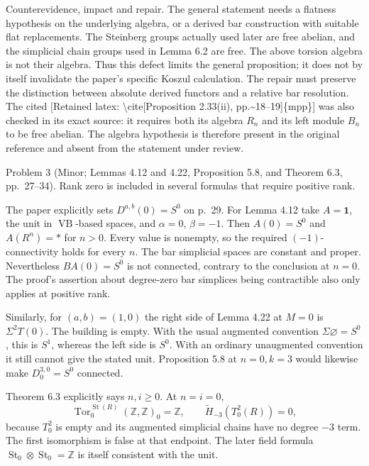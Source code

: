 \documentclass[10pt]{article}
\begin{document}
Counterevidence, impact and repair. The general statement needs a flatness hypothesis on the underlying algebra, or a derived bar construction with suitable flat replacements. The Steinberg groups actually used later are free abelian, and the simplicial chain groups used in Lemma 6.2 are free. The above torsion algebra is not their algebra. Thus this defect limits the general proposition; it does not by itself invalidate the paper’s specific Koszul calculation. The repair must preserve the distinction between absolute derived functors and a relative bar resolution. The cited [Retained latex: \textbackslash{}cite[Proposition 2.33(ii), pp.\textasciitilde{}18--19]\{mpp\}] was also checked in its exact source: it requires both its algebra \(R_n\) and its left module \(B_n\) to be free abelian. The algebra hypothesis is therefore present in the original reference and absent from the statement under review.\par
Problem 3 (Minor; Lemmas 4.12 and 4.22, Proposition 5.8, and Theorem 6.3, pp. 27–34).  Rank zero is included in several formulas that require positive rank.\par
The paper explicitly sets \(D^{a,b}(0)=S^0\) on p. 29. For Lemma 4.12 take \(A=\mathbf1\), the unit in \(\operatorname{VB}\)-based spaces, and \(\alpha=0\), \(\beta=-1\). Then \(A(0)=S^0\) and \(A(R^n)=*\) for \(n>0\). Every value is nonempty, so the required \((-1)\)-connectivity holds for every \(n\). The bar simplicial spaces are constant and proper. Nevertheless \(BA(0)=S^0\) is not connected, contrary to the conclusion at \(n=0\). The proof’s assertion about degree-zero bar simplices being contractible also only applies at positive rank.\par
Similarly, for \((a,b)=(1,0)\) the right side of Lemma 4.22 at \(M=0\) is \(\Sigma^2T(0)\). The building is empty. With the usual augmented convention \(\Sigma\varnothing=S^0\), this is \(S^1\), whereas the left side is \(S^0\). With an ordinary unaugmented convention it still cannot give the stated unit. Proposition 5.8 at \(n=0,k=3\) would likewise make \(D^{3,0}_0=S^0\) connected.\par
Theorem 6.3 explicitly says \(n,i\ge0\). At \(n=i=0\), \[\operatorname{Tor}^{\operatorname{St}(R)}_0(\mathbb Z,\mathbb Z)_0=\mathbb Z,\qquad
 \widetilde H_{-3}(T^2_0(R))=0,\] because \(T^2_0\) is empty and its augmented simplicial chains have no degree \(-3\) term. The first isomorphism is false at that endpoint. The later field formula \(\operatorname{St}_0\otimes\operatorname{St}_0=\mathbb Z\) is itself consistent with the unit.\par
\end{document}
